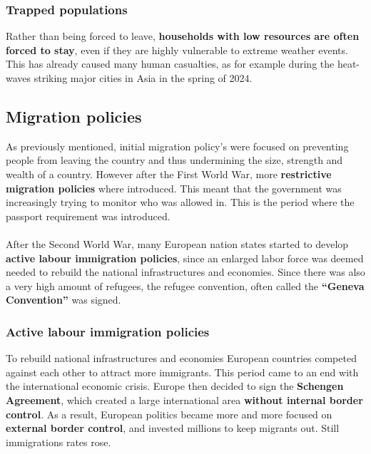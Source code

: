 \documentclass[../summary.tex]{subfiles}
\begin{document}
	\subsubsection{Trapped populations}
	Rather than being forced to leave, \textbf{households with low resources are often forced to stay}, even if they are highly vulnerable to extreme weather events. This has already caused  many human casualties, as for example during the heat-waves striking major cities in Asia in the spring of 2024. 
	
	\subsection{Migration policies}
	As previously mentioned, initial migration policy's were focused on preventing people from leaving the country and thus undermining the size, strength and wealth of a country. However after the First World War, more \textbf{restrictive migration policies} where introduced. This meant that the government was increasingly trying to monitor who was allowed in. This is the period where the passport requirement was introduced. 
	\\
	\\
	After the Second World War, many European nation states started to develop \textbf{active labour immigration policies}, since an enlarged labor force was deemed needed to rebuild the national infrastructures and economies. Since there was also a very high amount of refugees, the refugee convention, often called the \textbf{``Geneva Convention''} was signed.
	
	\newpage
	
	\subsubsection{Active labour immigration policies}
 	To rebuild national infrastructures and economies European countries competed against each other to attract more immigrants. This period came to an end with the international economic crisis. Europe then decided to sign the \textbf{Schengen Agreement}, which created a large international area \textbf{without internal border control}. As a result, European politics became more and more focused on \textbf{external border control}, and invested millions to keep migrants out. Still immigrations rates rose. 
 	
\end{document}
